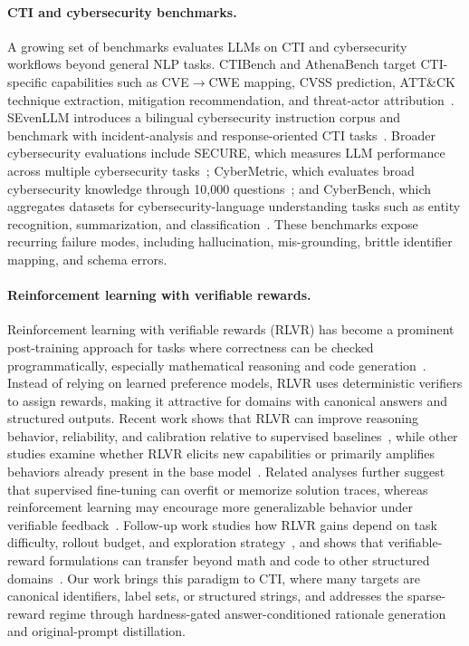 \paragraph{CTI and cybersecurity benchmarks.}
A growing set of benchmarks evaluates LLMs on CTI and cybersecurity workflows beyond general NLP tasks. CTIBench and AthenaBench target CTI-specific capabilities such as CVE$\rightarrow$CWE mapping, CVSS prediction, ATT\&CK technique extraction, mitigation recommendation, and threat-actor attribution~\citep{alam2024ctibench,alam2025athenabench}. SEvenLLM introduces a bilingual cybersecurity instruction corpus and benchmark with incident-analysis and response-oriented CTI tasks~\citep{ji2024sevenllm}. Broader cybersecurity evaluations include SECURE, which measures LLM performance across multiple cybersecurity tasks~\citep{DBLP:conf/acsac/BhusalANMLFFTBR24}; CyberMetric, which evaluates broad cybersecurity knowledge through 10{,}000 questions~\citep{cybermetric}; and CyberBench, which aggregates datasets for cybersecurity-language understanding tasks such as entity recognition, summarization, and classification~\citep{liu2024cyberbench}. These benchmarks expose recurring failure modes, including hallucination, mis-grounding, brittle identifier mapping, and schema errors. 

\paragraph{Reinforcement learning with verifiable rewards.}
Reinforcement learning with verifiable rewards (RLVR) has become a prominent post-training approach for tasks where correctness can be checked programmatically, especially mathematical reasoning and code generation~\citep{shao2024deepseekmath,deepseekr1}. Instead of relying on learned preference models, RLVR uses deterministic verifiers to assign rewards, making it attractive for domains with canonical answers and structured outputs. Recent work shows that RLVR can improve reasoning behavior, reliability, and calibration relative to supervised baselines~\citep{wen2025rlvr}, while other studies examine whether RLVR elicits new capabilities or primarily amplifies behaviors already present in the base model~\citep{yue2025does,cheng2025reasoning,wu2025invisibleleash}. Related analyses further suggest that supervised fine-tuning can overfit or memorize solution traces, whereas reinforcement learning may encourage more generalizable behavior under verifiable feedback~\citep{DBLP:conf/icml/ChuZYTXSLL025}. Follow-up work studies how RLVR gains depend on task difficulty, rollout budget, and exploration strategy~\citep{yang2025depth}, and shows that verifiable-reward formulations can transfer beyond math and code to other structured domains~\citep{lu2025generalization,su2025crossing}. Our work brings this paradigm to CTI, where many targets are canonical identifiers, label sets, or structured strings, and addresses the sparse-reward regime through hardness-gated answer-conditioned rationale generation and original-prompt distillation.
